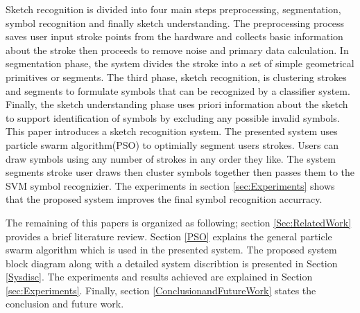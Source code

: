 \documentclass[a4paper,10pt]{IEEEconf}
\begin{document}
Sketch recognition is divided into four main steps preprocessing, segmentation, symbol recognition and finally sketch understanding. The preprocessing process saves user input stroke points from the hardware and collects basic information about the stroke then proceeds to remove noise and primary data calculation.  In segmentation phase, the system  divides the stroke into a set of simple geometrical primitives or segments.  The  third phase, sketch recognition, is clustering strokes and segments to formulate symbols that can be recognized by a classifier system. Finally, the sketch understanding phase uses priori information about the sketch to support identification of symbols by excluding any possible invalid symbols. 
This paper introduces a sketch recognition system. The presented system uses particle swarm algorithm(PSO) to optimially segment users strokes. Users can draw symbols using any number of strokes in any order they like. The system segments stroke user draws then cluster symbols together then passes them to the SVM symbol recognizier. The experiments in section \ref{sec:Experiments} shows that the proposed system improves the final symbol recognition accurracy. 

The remaining of this papers is organized as following; section \ref{Sec:RelatedWork} provides a brief literature review.  Section \ref{PSO} explains the general particle swarm algorithm which is used in the presented system. The proposed system block diagram along with a detailed system discribtion is presented in Section \ref{Sysdisc}.  The experiments and results achieved are explained in Section \ref{sec:Experiments}. Finally, section \ref{ConclusionandFutureWork} states the conclusion and future work. 
\end{document}
